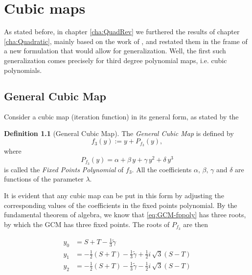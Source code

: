 \documentclass[10pt,twoside,titlepage]{book}
\numberwithin{equation}{chapter}
\numberwithin{figure}{chapter}
\numberwithin{table}{chapter}
\theoremstyle{plain}%
\theoremstyle{definition}
\newtheorem{defn}{Definition}[chapter]
\theoremstyle{remark}
\begin{document}
\chapter{Cubic maps}
\label{cha:Cubic}

As stated before, in chapter \ref{cha:QuadRev} we furthered the results of chapter \ref{cha:Quadratic}, mainly based on the work of \cite{Solis2004}, and restated them in the frame of a new formulation that would allow for generalization. Well, the first such generalization comes precisely for third degree polynomial maps, i.e. cubic polynomials.

\section{General Cubic Map}
\label{sec:GeneralCubicMap}

Consider a cubic map (iteration function) in its general form, as stated by the

\begin{defn}[General Cubic Map]
	The \emph{General Cubic Map} is defined by
	\begin{equation}
		f_3(y):=y+P_{f_3}(y),
		\label{eq:GCM}
	\end{equation}
	where
	\begin{equation}
		\label{eq:GCM-fppoly}
		P_{f_3}(y)=\alpha + \beta\,y + \gamma\,y^2 + \delta\,y^3
	\end{equation}
	is called the \emph{Fixed Points Polynomial} of $f_3$. All the coefficients $\alpha,\,\beta,\,\gamma$ and $\delta$ are functions of the parameter $\lambda$.
\end{defn}

It is evident that any cubic map can be put in this form by adjusting the corresponding values of the coefficients in the fixed points polynomial. By the fundamental theorem of algebra, we know that \eqref{eq:GCM-fppoly} has three roots, by which the GCM has three fixed points. The roots of $P_{f_3}$ are then \cite{MathHandbook}

\begin{equation}
	\begin{aligned}
		y_0 &= S+T-\frac{1}{3}\tilde{\gamma}\\
		y_1 &= -\frac{1}{2}(S+T)-\frac{1}{3}\tilde{\gamma}+\frac{1}{2}i\,\sqrt{3}(S-T)\\
		y_2 &= -\frac{1}{2}(S+T)-\frac{1}{3}\tilde{\gamma}-\frac{1}{2}i\,\sqrt{3}(S-T)
	\end{aligned}
\end{equation}
\end{document}
